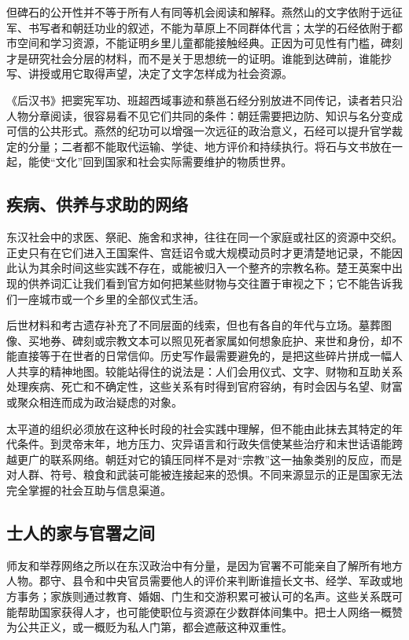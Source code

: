 但碑石的公开性并不等于所有人有同等机会阅读和解释。燕然山的文字依附于远征军、书写者和朝廷功业的叙述，不能为草原上不同群体代言；太学的石经依附于都市空间和学习资源，不能证明乡里儿童都能接触经典。正因为可见性有门槛，碑刻才是研究社会分层的材料，而不是关于思想统一的证明。谁能到达碑前，谁能抄写、讲授或用它取得声望，决定了文字怎样成为社会资源。

《后汉书》把窦宪军功、班超西域事迹和蔡邕石经分别放进不同传记，读者若只沿人物分章阅读，很容易看不见它们共同的条件：朝廷需要把边防、知识与名分变成可信的公共形式。燕然的纪功可以增强一次远征的政治意义，石经可以提升官学裁定的分量；二者都不能取代运输、学徒、地方评价和持续执行。将石与文书放在一起，能使“文化”回到国家和社会实际需要维护的物质世界。

\subsection{疾病、供养与求助的网络}

东汉社会中的求医、祭祀、施舍和求神，往往在同一个家庭或社区的资源中交织。正史只有在它们进入王国案件、宫廷诏令或大规模动员时才更清楚地记录，不能因此认为其余时间这些实践不存在，或能被归入一个整齐的宗教名称。楚王英案中出现的供养词汇让我们看到官方如何把某些财物与交往置于审视之下；它不能告诉我们一座城市或一个乡里的全部仪式生活。

后世材料和考古遗存补充了不同层面的线索，但也有各自的年代与立场。墓葬图像、买地券、碑刻或宗教文本可以照见死者家属如何想象庇护、来世和身份，却不能直接等于在世者的日常信仰。历史写作最需要避免的，是把这些碎片拼成一幅人人共享的精神地图。较能站得住的说法是：人们会用仪式、文字、财物和互助关系处理疾病、死亡和不确定性，这些关系有时得到官府容纳，有时会因与名望、财富或聚众相连而成为政治疑虑的对象。

太平道的组织必须放在这种长时段的社会实践中理解，但不能由此抹去其特定的年代条件。到灵帝末年，地方压力、灾异语言和行政失信使某些治疗和末世话语能跨越更广的联系网络。朝廷对它的镇压同样不是对“宗教”这一抽象类别的反应，而是对人群、符号、粮食和武装可能被连接起来的恐惧。不同来源显示的正是国家无法完全掌握的社会互助与信息渠道。

\subsection{士人的家与官署之间}

师友和举荐网络之所以在东汉政治中有分量，是因为官署不可能亲自了解所有地方人物。郡守、县令和中央官员需要他人的评价来判断谁擅长文书、经学、军政或地方事务；家族则通过教育、婚姻、门生和交游积累可被认可的名声。这些关系既可能帮助国家获得人才，也可能使职位与资源在少数群体间集中。把士人网络一概赞为公共正义，或一概贬为私人门第，都会遮蔽这种双重性。

